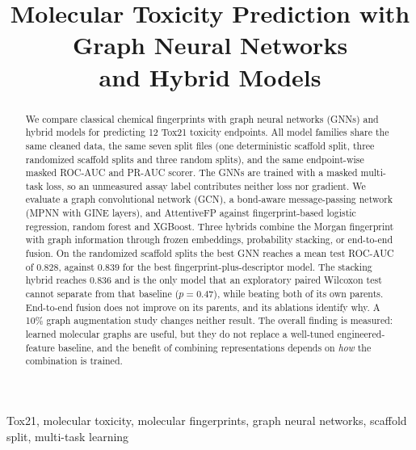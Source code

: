 \documentclass[conference]{IEEEtran}
\begin{document}
\title{Molecular Toxicity Prediction with Graph Neural Networks\\ and Hybrid Models}

\author{
}

\maketitle

\begin{abstract}
We compare classical chemical fingerprints with graph neural networks (GNNs) and hybrid
models for predicting 12 Tox21 toxicity endpoints. All model families share the same cleaned
data, the same seven split files (one deterministic scaffold split, three randomized scaffold
splits and three random splits), and the same endpoint-wise masked ROC-AUC and PR-AUC scorer.
The GNNs are trained with a masked multi-task loss, so an unmeasured assay label contributes
neither loss nor gradient. We evaluate a graph convolutional network (GCN), a bond-aware
message-passing network (MPNN with GINE layers), and AttentiveFP against fingerprint-based
logistic regression, random forest and XGBoost. Three hybrids combine the Morgan fingerprint
with graph information through frozen embeddings, probability stacking, or end-to-end fusion.
On the randomized scaffold splits the best GNN reaches a mean test ROC-AUC of
$0.828$, against $0.839$ for the best fingerprint-plus-descriptor model. The stacking hybrid
reaches $0.836$ and is the only model that an exploratory paired Wilcoxon test cannot separate
from that baseline ($p=0.47$), while beating both of its own parents. End-to-end fusion does
not improve on its parents, and its ablations identify why. A 10\% graph augmentation study
changes neither result. The overall finding is measured: learned molecular graphs are useful,
but they do not replace a well-tuned engineered-feature baseline, and the benefit of combining
representations depends on \emph{how} the combination is trained.
\end{abstract}

\begin{IEEEkeywords}
Tox21, molecular toxicity, molecular fingerprints, graph neural networks, scaffold split,
multi-task learning
\end{IEEEkeywords}
\end{document}
